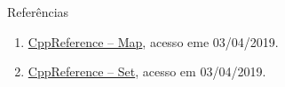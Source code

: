 \begin{frame}[fragile]{Referências}

    \begin{enumerate}
        \item \href{https://en.cppreference.com/w/cpp/container/map}{CppReference -- Map}, acesso eme 03/04/2019.

        \item \href{https://en.cppreference.com/w/cpp/container/set}{CppReference -- Set}, acesso em 03/04/2019.
    \end{enumerate}

\end{frame}

